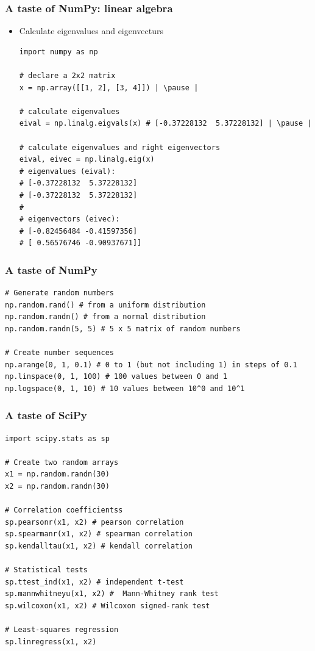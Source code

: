 \documentclass[xcolor=table]{beamer}
\begin{document}
\begin{frame}[fragile]
\frametitle{A taste of NumPy: linear algebra}
    \begin{itemize}
        \item Calculate eigenvalues and eigenvecturs
\begin{lstlisting}[style=python]
import numpy as np

# declare a 2x2 matrix
x = np.array([[1, 2], [3, 4]]) | \pause |

# calculate eigenvalues
eival = np.linalg.eigvals(x) # [-0.37228132  5.37228132] | \pause |

# calculate eigenvalues and right eigenvectors
eival, eivec = np.linalg.eig(x) 
# eigenvalues (eival): 
# [-0.37228132  5.37228132]
# [-0.37228132  5.37228132]
#
# eigenvectors (eivec):
# [-0.82456484 -0.41597356]
# [ 0.56576746 -0.90937671]]
\end{lstlisting}
    \end{itemize}
\end{frame}

\begin{frame}[fragile]
\frametitle{A taste of NumPy}

\begin{lstlisting}[style=python]
# Generate random numbers
np.random.rand() # from a uniform distribution
np.random.randn() # from a normal distribution
np.random.randn(5, 5) # 5 x 5 matrix of random numbers

# Create number sequences
np.arange(0, 1, 0.1) # 0 to 1 (but not including 1) in steps of 0.1
np.linspace(0, 1, 100) # 100 values between 0 and 1
np.logspace(0, 1, 10) # 10 values between 10^0 and 10^1
\end{lstlisting}

\end{frame}

\begin{frame}[fragile]
\frametitle{A taste of SciPy}

\begin{lstlisting}[style=python]
import scipy.stats as sp

# Create two random arrays
x1 = np.random.randn(30)
x2 = np.random.randn(30)

# Correlation coefficientss
sp.pearsonr(x1, x2) # pearson correlation
sp.spearmanr(x1, x2) # spearman correlation
sp.kendalltau(x1, x2) # kendall correlation

# Statistical tests
sp.ttest_ind(x1, x2) # independent t-test
sp.mannwhitneyu(x1, x2) #  Mann-Whitney rank test 
sp.wilcoxon(x1, x2) # Wilcoxon signed-rank test

# Least-squares regression
sp.linregress(x1, x2)
\end{lstlisting}

\end{frame}
\end{document}
